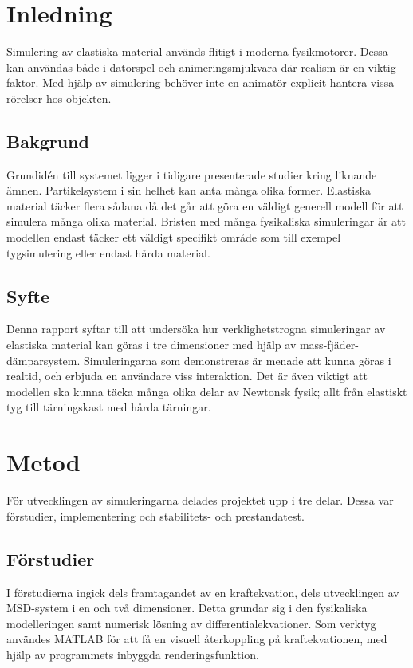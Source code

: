 \documentclass[a4paper,12pt,oneside,final,swedish]{extarticle}
\begin{document}
\pagebreak
\pagestyle{plain}
\setcounter{page}{1}

\section{Inledning}
Simulering av elastiska material används flitigt i moderna fysikmotorer. Dessa kan användas både i datorspel och animeringsmjukvara där realism är en viktig faktor. Med hjälp av simulering behöver inte en animatör explicit hantera vissa rörelser hos objekten.
\subsection{Bakgrund}
Grundidén till systemet ligger i tidigare presenterade studier kring liknande ämnen. Partikelsystem i sin helhet kan anta många olika former. Elastiska material täcker flera sådana då det går att göra en väldigt generell modell för att simulera många olika material. Bristen med många fysikaliska simuleringar är att modellen endast täcker ett väldigt specifikt område som till exempel tygsimulering eller endast hårda material.
\subsection{Syfte}
Denna rapport syftar till att undersöka hur verklighetstrogna simuleringar av elastiska material kan göras i tre dimensioner med hjälp av mass-fjäder-dämparsystem. Simuleringarna som demonstreras är menade att kunna göras i realtid, och erbjuda en användare viss interaktion. Det är även viktigt att modellen ska kunna täcka många olika delar av Newtonsk fysik; allt från elastiskt tyg till tärningskast med hårda tärningar.

\pagebreak
\section{Metod}
För utvecklingen av simuleringarna delades projektet upp i tre delar. Dessa var förstudier, implementering och stabilitets- och prestandatest.
\subsection{Förstudier}
I förstudierna ingick dels framtagandet av en kraftekvation, dels utvecklingen av MSD-system i en och två dimensioner. Detta grundar sig i den fysikaliska modelleringen samt numerisk lösning av differentialekvationer. Som verktyg användes MATLAB för att få en visuell återkoppling på kraftekvationen, med hjälp av programmets inbyggda renderingsfunktion.
\end{document}
